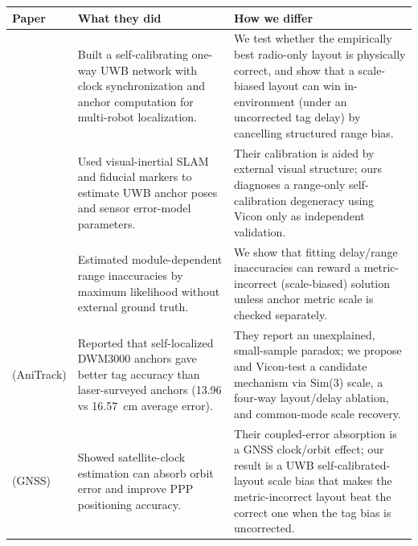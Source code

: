 \documentclass[10pt,a4paper]{article}
\makeatletter
\renewcommand\section{\@startsection{section}{1}{0pt}{0.65ex plus .2ex}{0.35ex}{\normalfont\normalsize\bfseries}}
\makeatother
\begin{document}
\section{Nearest Prior Art}

\begin{center}
\scriptsize
\begin{tabularx}{\textwidth}{@{}>{\raggedright\arraybackslash}p{28mm}>{\raggedright\arraybackslash}X>{\raggedright\arraybackslash}X@{}}
\toprule
Paper & What they did & How we differ \\
\midrule
\citet{hamer_2018_self_calibrating_ultra_wideband_network} & Built a self-calibrating one-way UWB network with clock synchronization and anchor computation for multi-robot localization. & We test whether the empirically best radio-only layout is physically correct, and show that a scale-biased layout can win in-environment (under an uncorrected tag delay) by cancelling structured range bias. \\
\citet{lutz_2019_visual_inertial_slam_uwb_error_model} & Used visual-inertial SLAM and fiducial markers to estimate UWB anchor poses and sensor error-model parameters. & Their calibration is aided by external visual structure; ours diagnoses a range-only self-calibration degeneracy using Vicon only as independent validation. \\
\citet{ledergerber_2018_calibrating_away_inaccuracies_uwb} & Estimated module-dependent range inaccuracies by maximum likelihood without external ground truth. & We show that fitting delay/range inaccuracies can reward a metric-incorrect (scale-biased) solution unless anchor metric scale is checked separately. \\
\citet{luder_2025_anitrack} (AniTrack) & Reported that self-localized DWM3000 anchors gave better tag accuracy than laser-surveyed anchors (13.96 vs 16.57~cm average error). & They report an unexplained, small-sample paradox; we propose and Vicon-test a candidate mechanism via Sim(3) scale, a four-way layout/delay ablation, and common-mode scale recovery. \\
\citet{pan_2015_realtime_ppp_clock_orbit} (GNSS) & Showed satellite-clock estimation can absorb orbit error and improve PPP positioning accuracy. & Their coupled-error absorption is a GNSS clock/orbit effect; our result is a UWB self-calibrated-layout scale bias that makes the metric-incorrect layout beat the correct one when the tag bias is uncorrected. \\
\bottomrule
\end{tabularx}
\end{center}
\end{document}
